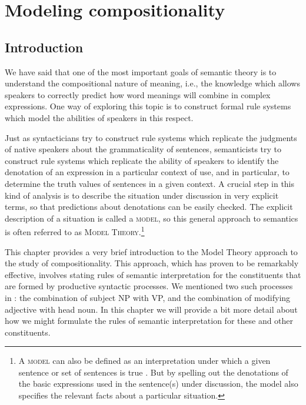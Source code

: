 \chapter{Modeling compositionality}\label{sec:13}

\section{Introduction}\label{sec:13.1}

We have said that one of the most important goals of semantic theory is to understand the compositional nature of meaning, i.e., the knowledge which allows speakers to correctly predict how word meanings will combine in complex expressions. One way of exploring this topic is to construct formal rule systems which model the abilities of speakers in this respect.



Just as syntacticians try to construct rule systems which replicate the judgments of native speakers about the grammaticality of sentences, semanticists try to construct rule systems which replicate the ability of speakers to identify the denotation of an expression in a particular context of use, and in particular, to determine the truth values of sentences in a given context. A crucial step in this kind of analysis is to describe the situation under discussion in very explicit terms, so that predictions about denotations can be easily checked. The explicit description of a situation is called a \textsc{model}, so this general approach to semantics is often referred to as \textsc{Model Theory}.\footnote{A \textsc{model} can also be defined as an interpretation under which a given sentence or set of sentences is true \citep{Hodges2013}. But by spelling out the denotations of the basic expressions used in the sentence(s) under discussion, the model also specifies the relevant facts about a particular situation.}



This chapter provides a very brief introduction to the Model Theory approach to the study of compositionality. This approach, which has proven to be remarkably effective, involves stating rules of semantic interpretation for the constituents that are formed by productive syntactic processes. We mentioned two such processes in : the combination of subject NP with VP, and the combination of modifying adjective with head noun. In this chapter we will provide a bit more detail about how we might formulate the rules of semantic interpretation for these and other constituents.



